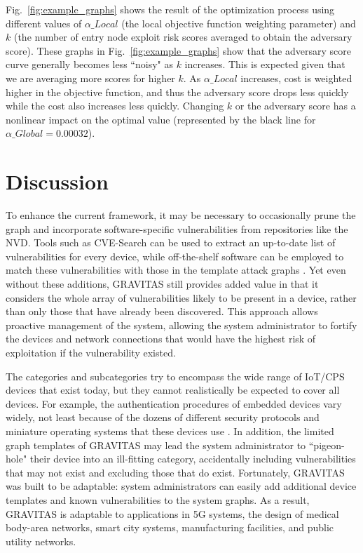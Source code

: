 \documentclass[10pt,journal,compsoc]{IEEEtran}
\begin{document}
\par Fig.~\ref{fig:example_graphs} shows the result of the optimization process using different values of $\alpha\_Local$ (the local objective function weighting parameter) and $k$ (the number of entry node exploit risk scores averaged to obtain the adversary score). These graphs in Fig.~\ref{fig:example_graphs} show that the adversary score curve generally 
becomes less ``noisy" as $k$ increases. This is expected given that we are averaging more scores for 
higher $k$. As $\alpha\_Local$ increases, cost is weighted higher in the objective function, and 
thus the adversary score drops less quickly while the cost also increases less quickly. Changing $k$ 
or the adversary score has a nonlinear impact on the optimal value (represented by the black line for $\alpha\_Global = 0.00032$).

\section{Discussion}
\label{section:discussion}

To enhance the current framework, it may be necessary to occasionally prune the graph and incorporate software-specific vulnerabilities from repositories like the NVD. Tools such as CVE-Search can be used to 
extract an up-to-date list of vulnerabilities for every device, while off-the-shelf software can be employed to match these vulnerabilities with those in the 
template attack graphs \cite{ghazo2019, dulaunoy2020, jajodia2009, openvas}. Yet even without these additions, GRAVITAS still provides added value in that it considers the whole array of vulnerabilities likely to be present in a device, rather than only those that have already been discovered. This approach allows proactive management of the system, allowing the system administrator to fortify the devices and network connections that would have the highest risk of exploitation if the vulnerability existed.

\par The categories and subcategories try to encompass the wide range of IoT/CPS devices that exist today, but they cannot realistically be expected to cover all devices. For example, the authentication procedures of embedded devices vary widely, not least because of the dozens of different security protocols and miniature operating systems that these devices use \cite{hahm2016}. In addition, the limited graph templates of GRAVITAS may lead the system administrator to ``pigeon-hole"  their device into an ill-fitting category, accidentally including vulnerabilities that may not exist and excluding those that do exist. Fortunately, GRAVITAS was built to be adaptable: system administrators can easily add additional device templates and known vulnerabilities to the system graphs. As a result, GRAVITAS is adaptable to applications in 5G systems, the design of medical body-area networks, smart city systems, manufacturing facilities, and public utility networks.
\end{document}
